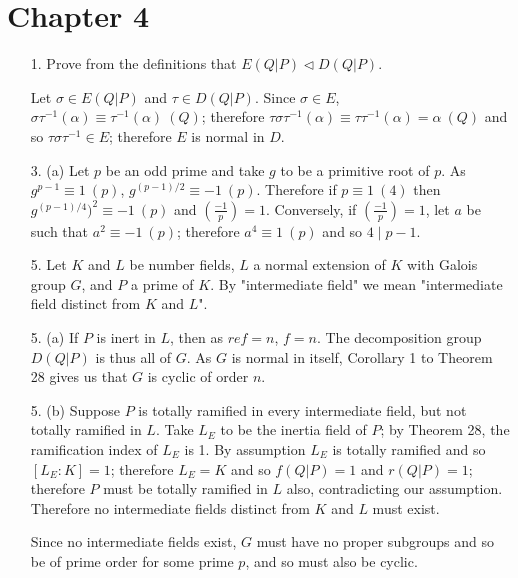 \documentclass{article}
\newcommand{\modequiv}[3]{#1 \equiv #2\ (#3)}
\begin{document}
\section*{Chapter 4}

\begin{enumerate}
    \item [1.] Prove from the definitions that $E(Q|P) \triangleleft D(Q|P)$.

    Let $\sigma \in E(Q|P)$ and $\tau \in D(Q|P)$.  Since $\sigma \in E$, $\modequiv{\sigma\tau^{-1}(\alpha)}{\tau^{-1}(\alpha)}{Q}$; therefore $\modequiv{\tau\sigma\tau^{-1}(\alpha)}{\tau\tau^{-1}(\alpha)= \alpha}{Q}$ and so $\tau\sigma\tau^{-1} \in E$; therefore $E$ is normal in $D$.

    \item[3. (a)]
    Let $p$ be an odd prime and take $g$ to be a primitive root of $p$.  As $\modequiv{g^{p-1}}{1}{p}$, $\modequiv{g^{(p-1)/2}}{-1}{p}$.  Therefore if $\modequiv{p}{1}{4}$ then $\modequiv{g^{(p-1)/4})^2}{-1}{p}$ and $\left(\frac{-1}{p}\right) = 1$.  Conversely, if $\left(\frac{-1}{p}\right) = 1$, let $a$ be such that $\modequiv{a^2}{-1}{p}$; therefore $\modequiv{a^4}{1}{p}$ and so $4 \mid p - 1$.


    \item [5.] Let $K$ and $L$ be number fields, $L$ a normal extension of $K$ with Galois group $G$, and $P$ a prime of $K$.  By "intermediate field" we mean "intermediate field distinct from $K$ and $L$".

    \item [5. (a)] If $P$ is inert in $L$, then as $ref = n$, $f = n$.  The decomposition group $D(Q|P)$ is thus all of $G$.  As $G$ is normal in itself, Corollary 1 to Theorem 28 gives us that $G$ is cyclic of order $n$.

    \item [5. (b)] Suppose $P$ is totally ramified in every intermediate field, but not totally ramified in $L$.  Take $L_E$ to be the inertia field of $P$; by Theorem 28, the ramification index of $L_{E}$ is 1.  By assumption $L_{E}$ is totally ramified and so $[L_{E} : K] = 1$; therefore $L_{E} = K$ and so $f(Q|P) = 1$ and $r(Q|P) = 1$; therefore $P$ must be totally ramified in $L$ also, contradicting our assumption.  Therefore no intermediate fields distinct from $K$ and $L$ must exist.

    Since no intermediate fields exist, $G$ must have no proper subgroups and so be of prime order for some prime $p$, and so must also be cyclic.


\end{enumerate}
\end{document}
